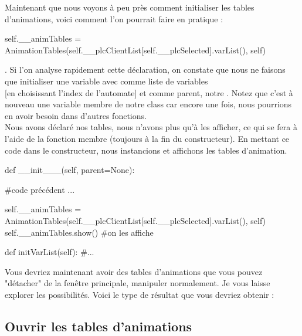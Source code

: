 Maintenant que nous voyons à peu près comment initialiser les tables d'animations, voici comment l'on pourrait faire en pratique :
\begin{Python}
self.__animTables = AnimationTables(self.__plcClientList[self.__plcSelected].varList(), self)
\end{Python}
.
Si l'on analyse rapidement cette déclaration, on constate que nous ne faisons que initialiser une variable  avec comme liste de variables \\  [en choisissant l'index de l'automate] et comme parent, notre .\newline
Notez que c'est à nouveau une variable membre de notre class  car encore une fois, nous pourrions en avoir besoin dans d'autres fonctions.\\

Nous avons déclaré nos tables, nous n'avons plus qu'à les afficher, ce qui se fera à l'aide de la fonction membre  (toujours à la fin du constructeur).
En mettant ce code dans le constructeur, nous instancions et affichons les tables d'animation.
\begin{Python}

def __init___(self, parent=None):

    #code précédent ...
    
    self.__animTables = AnimationTables(self.__plcClientList[self.__plcSelected].varList(), self)
    self.__animTables.show() #on les affiche
    
def initVarList(self):
    #...
\end{Python}



Vous devriez maintenant avoir des tables d'animations que vous pouvez "détacher" de la fenêtre principale, manipuler normalement. Je vous laisse explorer les possibilités.\newline
Voici le type de résultat que vous devriez obtenir :


\subsection{Ouvrir les tables d'animations}

